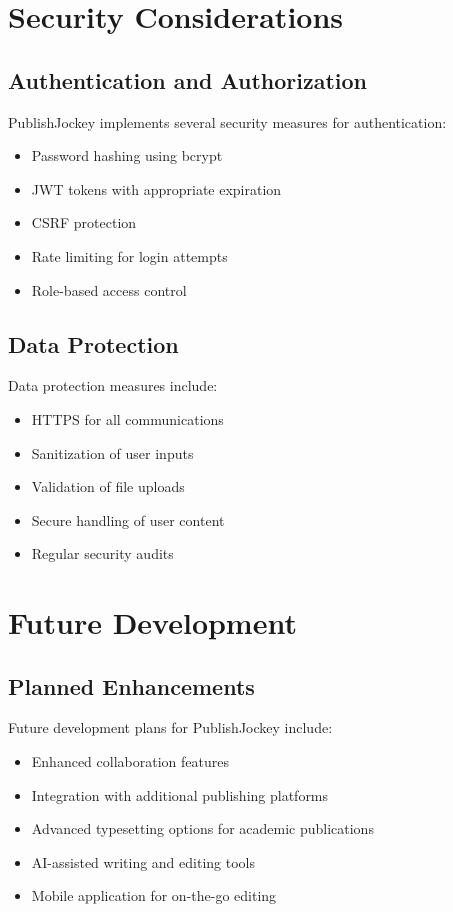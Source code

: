 \documentclass[12pt,a4paper]{book}
\begin{document}
\chapter{Security Considerations}

\section{Authentication and Authorization}

PublishJockey implements several security measures for authentication:

\begin{itemize}
  \item Password hashing using bcrypt
  \item JWT tokens with appropriate expiration
  \item CSRF protection
  \item Rate limiting for login attempts
  \item Role-based access control
\end{itemize}

\section{Data Protection}

Data protection measures include:

\begin{itemize}
  \item HTTPS for all communications
  \item Sanitization of user inputs
  \item Validation of file uploads
  \item Secure handling of user content
  \item Regular security audits
\end{itemize}

\chapter{Future Development}

\section{Planned Enhancements}

Future development plans for PublishJockey include:

\begin{itemize}
  \item Enhanced collaboration features
  \item Integration with additional publishing platforms
  \item Advanced typesetting options for academic publications
  \item AI-assisted writing and editing tools
  \item Mobile application for on-the-go editing
\end{itemize}
\end{document}

